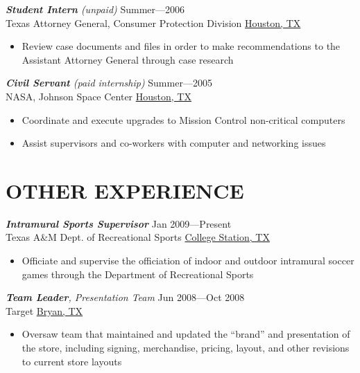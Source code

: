 \documentclass[margin]{res}
\begin{document}
\begin{resume}
                                 {\sl \textbf{Student Intern} (unpaid)} \hfill            Summer---2006 \\
                Texas Attorney General, Consumer Protection Division \hfill \underline{Houston, TX}
                 \begin{itemize}  \itemsep -2pt %
                 \item Review case documents and files in order to make recommendations to the Assistant Attorney General through case research
                 \end{itemize} 
                 
                {\sl \textbf{Civil Servant} (paid internship)} \hfill        Summer---2005\\
    NASA, Johnson Space Center \hfill \underline{Houston, TX}
    \begin{itemize} \itemsep -2pt
                   \item Coordinate and execute upgrades to Mission Control non-critical computers
                   \item Assist supervisors and co-workers with computer and networking issues
                   \end{itemize} 
                   
                   
\section{OTHER EXPERIENCE}
     {\sl \textbf{Intramural Sports Supervisor}} \hfill            Jan 2009---Present \\
                Texas A\&M Dept. of Recreational Sports \hfill \underline{College Station, TX} 
                 \begin{itemize}  \itemsep -2pt %
                 \item  Officiate and supervise the officiation of indoor and outdoor intramural soccer games through the Department of Recreational Sports
                 \end{itemize}               
                   
                   
                 {\sl \textbf{Team Leader}, Presentation Team} \hfill Jun 2008---Oct 2008 \\
                Target \hfill \underline{Bryan, TX} 
                 \begin{itemize}  \itemsep -2pt %
                 \item Oversaw team that maintained and updated the ``brand'' and presentation of the store, including signing, merchandise, pricing, layout, and other revisions to current store layouts
                \end{itemize}
 




\end{resume}
\end{document}
